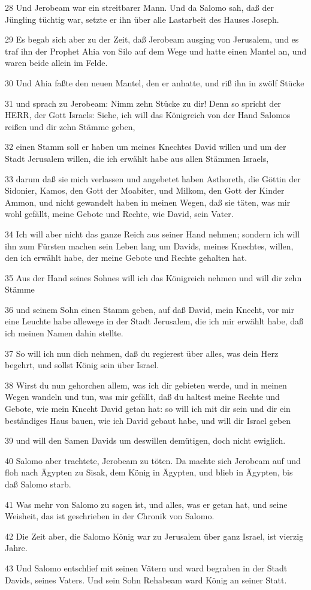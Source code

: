 \par 28 Und Jerobeam war ein streitbarer Mann. Und da Salomo sah, daß der Jüngling tüchtig war, setzte er ihn über alle Lastarbeit des Hauses Joseph.
\par 29 Es begab sich aber zu der Zeit, daß Jerobeam ausging von Jerusalem, und es traf ihn der Prophet Ahia von Silo auf dem Wege und hatte einen Mantel an, und waren beide allein im Felde.
\par 30 Und Ahia faßte den neuen Mantel, den er anhatte, und riß ihn in zwölf Stücke
\par 31 und sprach zu Jerobeam: Nimm zehn Stücke zu dir! Denn so spricht der HERR, der Gott Israels: Siehe, ich will das Königreich von der Hand Salomos reißen und dir zehn Stämme geben,
\par 32 einen Stamm soll er haben um meines Knechtes David willen und um der Stadt Jerusalem willen, die ich erwählt habe aus allen Stämmen Israels,
\par 33 darum daß sie mich verlassen und angebetet haben Asthoreth, die Göttin der Sidonier, Kamos, den Gott der Moabiter, und Milkom, den Gott der Kinder Ammon, und nicht gewandelt haben in meinen Wegen, daß sie täten, was mir wohl gefällt, meine Gebote und Rechte, wie David, sein Vater.
\par 34 Ich will aber nicht das ganze Reich aus seiner Hand nehmen; sondern ich will ihn zum Fürsten machen sein Leben lang um Davids, meines Knechtes, willen, den ich erwählt habe, der meine Gebote und Rechte gehalten hat.
\par 35 Aus der Hand seines Sohnes will ich das Königreich nehmen und will dir zehn Stämme
\par 36 und seinem Sohn einen Stamm geben, auf daß David, mein Knecht, vor mir eine Leuchte habe allewege in der Stadt Jerusalem, die ich mir erwählt habe, daß ich meinen Namen dahin stellte.
\par 37 So will ich nun dich nehmen, daß du regierest über alles, was dein Herz begehrt, und sollst König sein über Israel.
\par 38 Wirst du nun gehorchen allem, was ich dir gebieten werde, und in meinen Wegen wandeln und tun, was mir gefällt, daß du haltest meine Rechte und Gebote, wie mein Knecht David getan hat: so will ich mit dir sein und dir ein beständiges Haus bauen, wie ich David gebaut habe, und will dir Israel geben
\par 39 und will den Samen Davids um deswillen demütigen, doch nicht ewiglich.
\par 40 Salomo aber trachtete, Jerobeam zu töten. Da machte sich Jerobeam auf und floh nach Ägypten zu Sisak, dem König in Ägypten, und blieb in Ägypten, bis daß Salomo starb.
\par 41 Was mehr von Salomo zu sagen ist, und alles, was er getan hat, und seine Weisheit, das ist geschrieben in der Chronik von Salomo.
\par 42 Die Zeit aber, die Salomo König war zu Jerusalem über ganz Israel, ist vierzig Jahre.
\par 43 Und Salomo entschlief mit seinen Vätern und ward begraben in der Stadt Davids, seines Vaters. Und sein Sohn Rehabeam ward König an seiner Statt.

